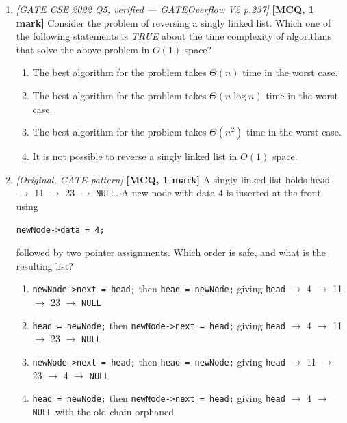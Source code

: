 \documentclass[11pt]{article}
\begin{document}
\begin{enumerate}
\item[\textbf{Q6}] \textit{[GATE CSE 2022 Q5, verified --- GATEOverflow V2 p.237]} \textbf{[MCQ, 1 mark]} Consider the problem of reversing a singly linked list. Which one of the following statements is \emph{TRUE} about the time complexity of algorithms that solve the above problem in $O(1)$ space?
\begin{enumerate}
  \item[(A)] The best algorithm for the problem takes $\Theta(n)$ time in the worst case.
  \item[(B)] The best algorithm for the problem takes $\Theta(n \log n)$ time in the worst case.
  \item[(C)] The best algorithm for the problem takes $\Theta(n^2)$ time in the worst case.
  \item[(D)] It is not possible to reverse a singly linked list in $O(1)$ space.
\end{enumerate}

\item[\textbf{Q7}] \textit{[Original, GATE-pattern]} \textbf{[MCQ, 1 mark]} A singly linked list holds \texttt{head} $\to$ 11 $\to$ 23 $\to$ \texttt{NULL}. A new node with data $4$ is inserted at the front using
\begin{verbatim}
newNode->data = 4;
\end{verbatim}
followed by two pointer assignments. Which order is safe, and what is the resulting list?
\begin{enumerate}
  \item[(A)] \texttt{newNode->next = head;} then \texttt{head = newNode;} giving \texttt{head} $\to$ 4 $\to$ 11 $\to$ 23 $\to$ \texttt{NULL}
  \item[(B)] \texttt{head = newNode;} then \texttt{newNode->next = head;} giving \texttt{head} $\to$ 4 $\to$ 11 $\to$ 23 $\to$ \texttt{NULL}
  \item[(C)] \texttt{newNode->next = head;} then \texttt{head = newNode;} giving \texttt{head} $\to$ 11 $\to$ 23 $\to$ 4 $\to$ \texttt{NULL}
  \item[(D)] \texttt{head = newNode;} then \texttt{newNode->next = head;} giving \texttt{head} $\to$ 4 $\to$ \texttt{NULL} with the old chain orphaned
\end{enumerate}


\end{enumerate}
\end{document}
